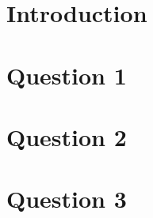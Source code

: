 \titlenew				%
\pagenumbers			%
\maketitle              %
\newpage                %
\tableofcontents        %
\newpage                %
\flushleft

\section{Introduction}

\section{Question 1}

\section{Question 2}

\section{Question 3}




